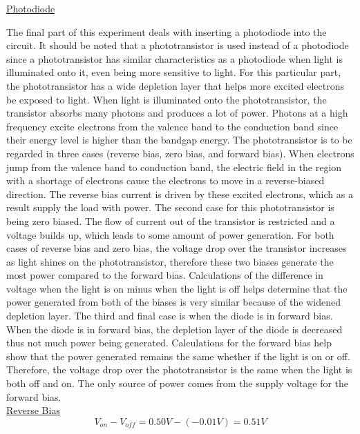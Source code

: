 \underline{Photodiode}

The final part of this experiment deals with inserting a photodiode into the circuit. It should be noted that a phototransistor is used instead of a photodiode since a  phototransistor has similar characteristics as a photodiode when light is illuminated onto it, even being more sensitive to light. For this particular part, the phototransistor has a wide depletion layer that helps more excited electrons be exposed to light. When light is illuminated onto the phototransistor, the transistor absorbs many photons and produces a lot of power. Photons at a high frequency excite electrons from the valence band to the conduction band since their energy level is higher than the bandgap energy. The phototransistor is to be regarded in three cases (reverse bias, zero bias, and forward bias). When electrons jump from the valence band to conduction band, the electric field in the region with a shortage of electrons cause the electrons to move in a reverse-biased direction. The reverse bias current is driven by these excited electrons, which as a result supply the load with power. The second case for this phototransistor is being zero biased. The flow of current out of the transistor is restricted and a voltage builds up, which leads to some amount of power generation. For both cases of reverse bias and zero bias, the voltage drop over the transistor increases as light shines on the phototransistor, therefore these two biases generate the most power compared to the forward bias. Calculations of the difference in voltage when the light is on minus when the light is off helps determine that the power generated from both of the biases is very similar because of the widened depletion layer. The third and final case is when the diode is in forward bias. When the diode is in forward bias, the depletion layer of the diode is decreased thus not much power being generated. Calculations for the forward bias help show that the power generated remains the same whether if the light is on or off. Therefore, the voltage drop over the phototransistor is the same when the light is both off and on. The only source of power comes from the supply voltage for the forward bias. \\

\underline{Reverse Bias}\\
\begin{equation}
\label{eq:Reverse Bias}
{V_{on}}-{V_{off}} = 0.50V - (-0.01V) = 0.51V 
\end{equation}

